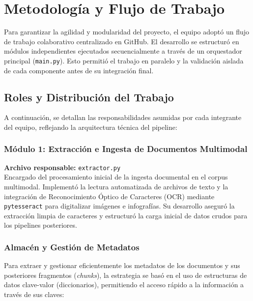 \documentclass[12pt,a4paper]{article}
\begin{document}
\section{Metodología y Flujo de Trabajo}
Para garantizar la agilidad y modularidad del proyecto, el equipo adoptó un flujo de trabajo colaborativo centralizado en GitHub. El desarrollo se estructuró en módulos independientes ejecutados secuencialmente a través de un orquestador principal (\texttt{main.py}). Esto permitió el trabajo en paralelo y la validación aislada de cada componente antes de su integración final.

\subsection{Roles y Distribución del Trabajo}
A continuación, se detallan las responsabilidades asumidas por cada integrante del equipo, reflejando la arquitectura técnica del pipeline:

\subsubsection{Módulo 1: Extracción e Ingesta de Documentos Multimodal}
\textbf{Archivo responsable:} \texttt{extractor.py}\\
Encargado del procesamiento inicial de la ingesta documental en el corpus multimodal. Implementó la lectura automatizada de archivos de texto y la integración de Reconocimiento Óptico de Caracteres (OCR) mediante \texttt{pytesseract} para digitalizar imágenes e infografías. Su desarrollo aseguró la extracción limpia de caracteres y estructuró la carga inicial de datos crudos para los pipelines posteriores.

\subsubsection{Almacén y Gestión de Metadatos}

Para extraer y gestionar eficientemente los metadatos de los documentos y sus posteriores fragmentos (\textit{chunks}), la estrategia se basó en el uso de estructuras de datos clave-valor (diccionarios), permitiendo el acceso rápido a la información a través de sus claves:
\end{document}
